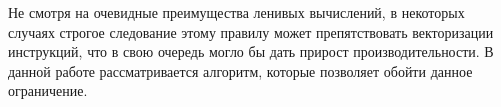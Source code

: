 Не смотря на очевидные преимущества ленивых вычислений, в некоторых случаях строгое следование этому правилу может препятствовать векторизации инструкций, что в свою очередь могло бы дать прирост производительности. В данной работе рассматривается алгоритм, которые позволяет обойти данное ограничение.
\newpage
